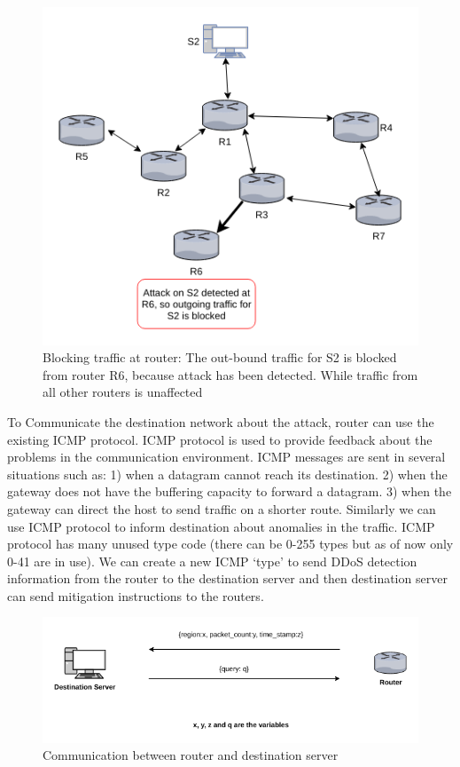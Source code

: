 \documentclass[12pt,oneside,a4paper]{article}
\begin{document}
\begin{figure}[H]
\centering
\includegraphics[scale=0.60]{mitigation_path}
\caption{Blocking traffic at router: The out-bound traffic for S2 is blocked from router R6,
because attack has been detected. While traffic from all other routers is unaffected} \label{fig:mitigation_path}
\end{figure}

To Communicate the destination network about the attack, router can use the existing ICMP protocol. ICMP protocol is used to provide feedback about the problems in the communication environment. ICMP messages are sent in several situations such as: 1) when a datagram cannot reach its destination. 2) when the gateway does not have the buffering capacity to forward a datagram. 3) when the gateway can direct the host to send traffic on a shorter route.\cite{icmp} Similarly we can use ICMP protocol to inform destination about anomalies in the traffic. ICMP protocol has many unused type code (there can be 0-255 types but as of now only 0-41 are in use). We can create a new ICMP `type' to send DDoS detection information from the router to the destination server and then destination server can send mitigation instructions to the routers.

\begin{figure}[H]
\centering
\includegraphics[scale=0.5]{router-network-communication}
\caption{Communication between router and destination server} \label{fig:router-network-communication}
\end{figure}
\end{document}
